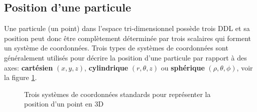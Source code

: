 \subsection{Position d'une particule}
\label{sec:syscoordparticule}

Une particule (un point) dans l'espace tri-dimensionnel possède trois DDL et sa position peut donc être complètement déterminée par trois scalaires qui forment un système de coordonnées. Trois types de systèmes de coordonnées sont généralement utilisés pour décrire la position d'une particule par rapport à des axes: \textbf{cartésien} $( x, y, z)$, \textbf{cylindrique} $( r, \theta, z)$ ou \textbf{sphérique} $( \rho, \theta, \phi)$, voir la figure \ref{fig:coorsys}. 

\begin{figure}[H]
        \centering
        \caption{Trois systèmes de coordonnées standards pour représenter la position d'un point en 3D}
				\label{fig:coorsys}
\end{figure}

